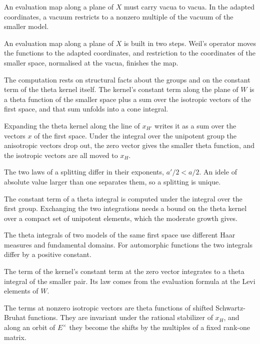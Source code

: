 An evaluation map along a plane of $X$ must carry vacua to vacua. In the
adapted coordinates, a vacuum restricts to a nonzero multiple of the vacuum of
the smaller model.

An evaluation map along a plane of $X$ is built in two steps. Weil's operator
moves the functions to the adapted coordinates, and restriction to the
coordinates of the smaller space, normalised at the vacua, finishes the map.

The computation rests on structural facts about the groups and on the constant
term of the theta kernel itself. The kernel's constant term along the plane of
$W$ is a theta function of the smaller space plus a sum over the isotropic
vectors of the first space, and that sum unfolds into a cone integral.

Expanding the theta kernel along the line of $x_{H'}$ writes it as a sum over
the vectors $x$ of the first space. Under the integral over the unipotent
group the anisotropic vectors drop out, the zero vector gives the smaller
theta function, and the isotropic vectors are all moved to $x_H$.

The two laws of a splitting differ in their exponents, $a'/2<a/2$. An idele of
absolute value larger than one separates them, so a splitting is unique.

The constant term of a theta integral is computed under the integral over the
first group. Exchanging the two integrations needs a bound on the theta kernel
over a compact set of unipotent elements, which the moderate growth gives.

The theta integrals of two models of the same first space use different Haar
measures and fundamental domains. For automorphic functions the two integrals
differ by a positive constant.

The term of the kernel's constant term at the zero vector integrates to a theta
integral of the smaller pair. Its law comes from the evaluation formula at the
Levi elements of $W$.

The terms at nonzero isotropic vectors are theta functions of shifted
Schwartz-Bruhat functions. They are invariant under the rational stabilizer of
$x_H$, and along an orbit of $E^\times$ they become the shifts by the multiples
of a fixed rank-one matrix.

